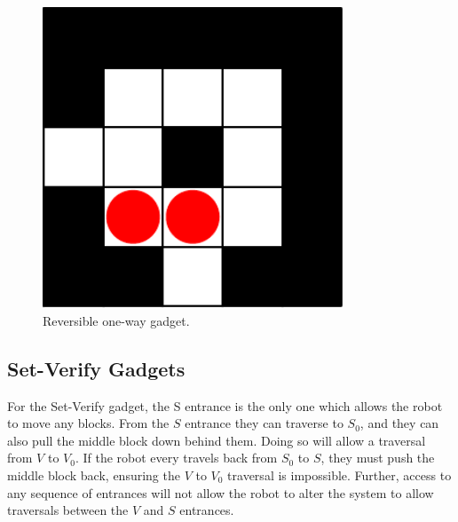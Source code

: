 \documentclass[11pt]{article}
\begin{document}
\begin{figure}[!ht]
  \centering
    \includegraphics[width=0.8\textwidth]{one_way.pdf}
    \caption{Reversible one-way gadget.}
    \label{ldeScreenshotsMap}
\end{figure}

\subsection{Set-Verify Gadgets}
For the Set-Verify gadget, the S entrance is the only one which allows the robot to move any blocks. From the $S$ entrance they can traverse to $S_0$, and they can also pull the middle block down behind them. Doing so will allow a traversal from $V$ to $V_0$. If the robot every travels back from $S_0$ to $S$, they must push the middle block back, ensuring the $V$ to $V_0$ traversal is impossible. Further, access to any sequence of entrances will not allow the robot to alter the system to allow traversals between the $V$ and $S$ entrances. \\
\end{document}
